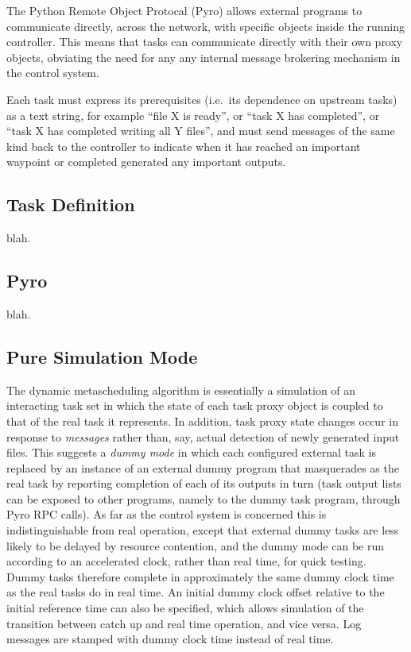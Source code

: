 The Python Remote Object Protocal (Pyro) allows external programs to
communicate directly, across the network, with specific objects inside
the running controller. This means that tasks can communicate directly
with their own proxy objects, obviating the need for any any internal
message brokering mechanism in the control system.    

Each task must express its prerequisites (i.e.\ its dependence on
upstream tasks) as a text string, for example ``file X is ready'', or
``task X has completed'', or ``task X has completed writing all Y
files'', and must send messages of the same kind back to the controller
to indicate when it has reached an important waypoint or completed
generated any important outputs.  


\subsection{Task Definition}
blah.

\subsection{Pyro}
blah.

\subsection{Pure Simulation Mode}

The dynamic metascheduling algorithm is essentially a simulation of an
interacting task set in which the state of each task proxy object is
coupled to that of the real task it represents. In addition, task proxy
state changes occur in response to {\em messages} rather than, say,
actual detection of newly generated input files.  This suggests
a {\em dummy mode} in which each configured external task is replaced by
an instance of an external dummy program that masquerades as the real
task by reporting completion of each of its outputs in turn (task output
lists can be exposed to other programs, namely to the dummy task
program, through Pyro RPC calls). As far as the control system is
concerned this is indistinguishable from real operation, except that
external dummy tasks are less likely to be delayed by resource
contention, and the dummy mode can be run according to an accelerated
clock, rather than real time, for quick testing.  Dummy tasks therefore
complete in approximately the same dummy clock time as the real tasks do
in real time. An initial dummy clock offset relative to the initial
reference time can also be specified, which allows simulation of the
transition between catch up and real time operation, and vice versa. Log
messages are stamped with dummy clock time instead of real time.

